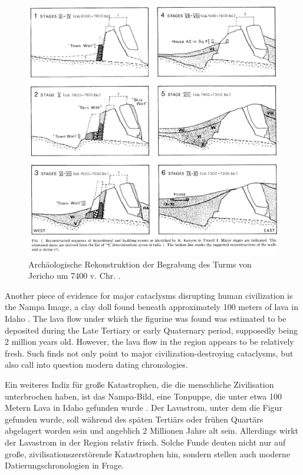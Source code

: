 \documentclass[10pt,twocolumn,letterpaper]{article}
\begin{document}
\begin{figure}[t]
\begin{center}
   \includegraphics[width=1\linewidth]{jericho.jpg}
\end{center}
   \caption{Archäologische Rekonstruktion der Begrabung des Turms von Jericho um 7400 v. Chr. \cite{95}.}
\label{fig:14}
\label{fig:onecol}
\end{figure}
Another piece of evidence for major cataclysms disrupting human civilization is the Nampa Image, a clay doll found beneath approximately 100 meters of lava in Idaho \cite{102,103}. The lava flow under which the figurine was found was estimated to be deposited during the Late Tertiary or early Quaternary period, supposedly being 2 million years old. However, the lava flow in the region appears to be relatively fresh. Such finds not only point to major civilization-destroying cataclysms, but also call into question modern dating chronologies.

Ein weiteres Indiz für große Katastrophen, die die menschliche Zivilisation unterbrochen haben, ist das Nampa-Bild, eine Tonpuppe, die unter etwa 100 Metern Lava in Idaho gefunden wurde \cite{102,103}. Der Lavastrom, unter dem die Figur gefunden wurde, soll während des späten Tertiärs oder frühen Quartärs abgelagert worden sein und angeblich 2 Millionen Jahre alt sein. Allerdings wirkt der Lavastrom in der Region relativ frisch. Solche Funde deuten nicht nur auf große, zivilisationszerstörende Katastrophen hin, sondern stellen auch moderne Datierungschronologien in Frage.
\end{document}
